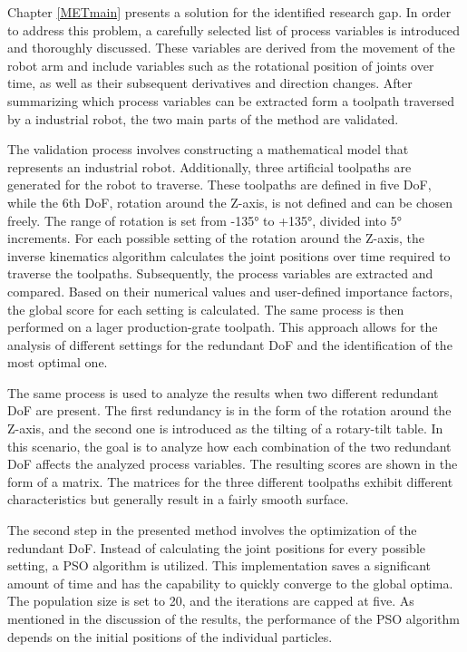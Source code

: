 Chapter \ref{METmain} presents a solution for the identified research gap. In order to address this problem, a carefully selected list of process variables is introduced and thoroughly discussed. These variables are derived from the movement of the robot arm and include variables such as the rotational position of joints over time, as well as their subsequent derivatives and direction changes.
After summarizing which process variables can be extracted form a toolpath traversed by a industrial robot, the two main parts of the method are validated. 


The validation process involves constructing a mathematical model that represents an industrial robot. Additionally, three artificial toolpaths are generated for the robot to traverse. These toolpaths are defined in five \acrshort{DoF}, while the 6th \acrshort{DoF}, rotation around the Z-axis, is not defined and can be chosen freely. The range of rotation is set from -135° to +135°, divided into 5° increments. For each possible setting of the rotation around the Z-axis, the inverse kinematics algorithm calculates the joint positions over time required to traverse the toolpaths. Subsequently, the process variables are extracted and compared. Based on their numerical values and user-defined importance factors, the global score for each setting is calculated. The same process is then performed on a lager production-grate toolpath. This approach allows for the analysis of different settings for the redundant \acrshort{DoF} and the identification of the most optimal one.

The same process is used to analyze the results when two different redundant \acrshort{DoF} are present. The first redundancy is in the form of the rotation around the Z-axis, and the second one is introduced as the tilting of a rotary-tilt table. In this scenario, the goal is to analyze how each combination of the two redundant \acrshort{DoF} affects the analyzed process variables. The resulting scores are shown in the form of a matrix. The matrices for the three different toolpaths exhibit different characteristics but generally result in a fairly smooth surface.

The second step in the presented method involves the optimization of the redundant \acrshort{DoF}. Instead of calculating the joint positions for every possible setting, a \acrshort{PSO} algorithm is utilized. This implementation saves a significant amount of time and has the capability to quickly converge to the global optima. The population size is set to 20, and the iterations are capped at five.
As mentioned in the discussion of the results, the performance of the PSO algorithm depends on the initial positions of the individual particles.

